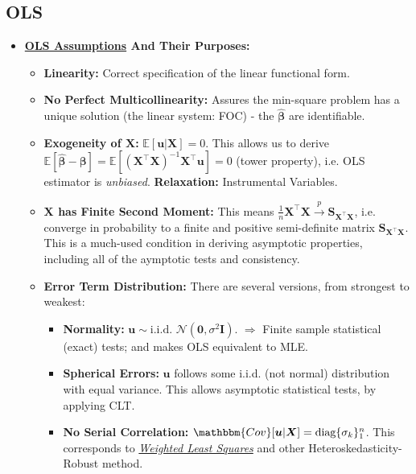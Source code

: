 \documentclass[9pt, landscape]{article}
\begin{document}
\begin{multicols*}{3}
\section{OLS}
\begin{itemize}
	\item \textbf{\href{https://en.wikipedia.org/wiki/Ordinary_least_squares\#Assumptions}{OLS Assumptions} And Their Purposes:}
	\begin{itemize}[leftmargin=10pt,noitemsep,topsep=0pt,partopsep=0pt]
		\item[-] \textbf{Linearity:} Correct specification of the linear functional form. 
		\item[-] \textbf{No Perfect Multicollinearity:} Assures the min-square problem has a unique solution (the linear system: FOC) - the $\widehat{\bm{\beta}}$ are identifiable.
		\item[-] \textbf{Exogeneity of $\bm{X}$:} $\mathbb{E}\left[\bm{u} | \bm{X}\right] = 0$. This allows us to derive $\mathbb{E}\left[\widehat{\bm{\beta}} - \bm{\beta}\right] = \mathbb{E}\left[(\bm{X}^{\top} \bm{X})^{-1} \bm{X}^{\top} \bm{u}\right] = 0$ (tower property), i.e. OLS estimator is \textit{unbiased}. \textbf{Relaxation:} Instrumental Variables.
		\item[-] \textbf{$\bm{X}$ has Finite Second Moment:} This means $\frac{1}{n} \bm{X}^{\top} \bm{X} \xrightarrow{p} \bm{S}_{\bm{X}^{\top} \bm{X}}$, i.e. converge in probability to a finite and positive semi-definite matrix $\bm{S}_{\bm{X}^{\top} \bm{X}}$. This is a much-used condition in deriving asymptotic properties, including all of the aymptotic tests and consistency.
		\item[-] \textbf{Error Term Distribution:} There are several versions, from strongest to weakest:
		\begin{itemize}[leftmargin=10pt,noitemsep,topsep=0pt,partopsep=0pt]
			\item[1.] \textbf{Normality:} $\bm{u} \sim \text{i.i.d. } \mathcal{N}(\bm{0}, \sigma^2 \bm{I})$. $\Rightarrow$ Finite sample statistical (exact) tests; and makes OLS equivalent to MLE.
			\item[2.] \textbf{Spherical Errors:} $\bm{u}$ follows some i.i.d. (not normal) distribution with equal variance. This allows asymptotic statistical tests, by applying CLT.
			\item[3.] \textbf{No Serial Correlation:} $\mathbbm{Cov}[\bm{u}|\bm{X}] = \text{diag}\{\sigma_k\}_1^n$. This corresponds to \href{https://en.wikipedia.org/wiki/Weighted_least_squares}{\textit{Weighted Least Squares}} and other Heteroskedasticity-Robust method.

\end{itemize}
\end{itemize}
\end{itemize}
\end{multicols*}
\end{document}
